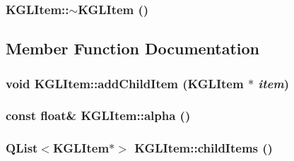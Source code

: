 \hypertarget{class_k_g_l_item_a303f5bf35c176400181aa59e3093ffa}{
\subsubsection[{$\sim$KGLItem}]{\setlength{\rightskip}{0pt plus 5cm}KGLItem::$\sim$KGLItem ()}}
\label{class_k_g_l_item_a303f5bf35c176400181aa59e3093ffa}




\subsection{Member Function Documentation}
\hypertarget{class_k_g_l_item_a667143176d94fd2366c64cd5d34b46e}{
\subsubsection[{addChildItem}]{\setlength{\rightskip}{0pt plus 5cm}void KGLItem::addChildItem ({\bf KGLItem} $\ast$ {\em item})}}
\label{class_k_g_l_item_a667143176d94fd2366c64cd5d34b46e}


\hypertarget{class_k_g_l_item_b9e32117300fa687fa861903af862731}{
\subsubsection[{alpha}]{\setlength{\rightskip}{0pt plus 5cm}const float\& KGLItem::alpha ()}}
\label{class_k_g_l_item_b9e32117300fa687fa861903af862731}


\hypertarget{class_k_g_l_item_1dcc73984997f926f8188663f2e98443}{
\subsubsection[{childItems}]{\setlength{\rightskip}{0pt plus 5cm}QList$<${\bf KGLItem}$\ast$$>$ KGLItem::childItems ()}}
\label{class_k_g_l_item_1dcc73984997f926f8188663f2e98443}


